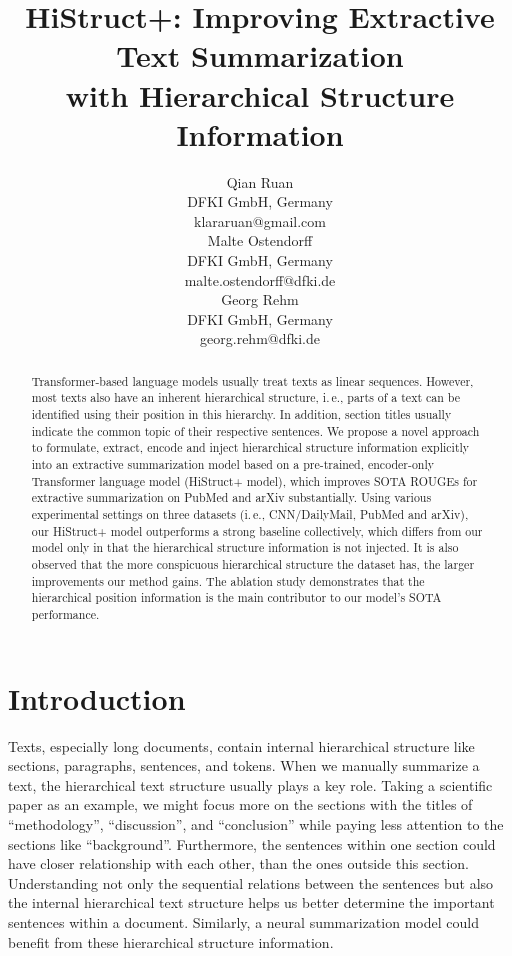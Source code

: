 \documentclass[11pt]{article}
\title{HiStruct+: Improving Extractive Text Summarization\\ with Hierarchical Structure Information}
\author{Qian Ruan \\
  DFKI GmbH, Germany \\
  klararuan@gmail.com \\ \And
  Malte Ostendorff  \\
  DFKI GmbH, Germany \\
  malte.ostendorff@dfki.de \\\And
  Georg Rehm \\
  DFKI GmbH, Germany \\
  georg.rehm@dfki.de}
\begin{document}
\maketitle
\begin{abstract}

Transformer-based language models usually treat texts as linear sequences. However, most texts also have an inherent hierarchical structure, i.\,e., parts of a text can be identified using their position in this hierarchy. In addition, section titles usually indicate the common topic of their respective sentences. We propose a novel approach to formulate, extract, encode and inject hierarchical structure information explicitly into an extractive summarization model based on a pre-trained, encoder-only Transformer language model (HiStruct+ model), which improves SOTA
ROUGEs for extractive summarization on PubMed and arXiv substantially. Using various experimental settings on three datasets (i.\,e., CNN/DailyMail, PubMed and arXiv), our HiStruct+ model outperforms a strong baseline collectively, which differs from our model only in that the hierarchical structure information is not injected.  It is also observed
that the more conspicuous hierarchical structure the dataset has, the larger improvements
our method gains. The ablation study demonstrates that the hierarchical position information is the main contributor to our model’s SOTA performance.

\end{abstract}

\section{Introduction}
\label{sec:Introduction}
Texts, especially long documents, contain internal hierarchical structure like sections, paragraphs, sentences, and tokens. When we manually summarize a text, the hierarchical text structure usually plays a key role. Taking a scientific paper as an example, we might focus more on the sections with the titles of  ``methodology'', ``discussion'', and ``conclusion'' while paying less attention to the sections like ``background''. Furthermore, the sentences within one section could have closer relationship with each other, than the ones outside this section. Understanding not only the sequential relations between the sentences but also the internal hierarchical text structure helps us better determine the important sentences within a document. Similarly, a neural summarization model could benefit from these hierarchical structure information.
\end{document}
